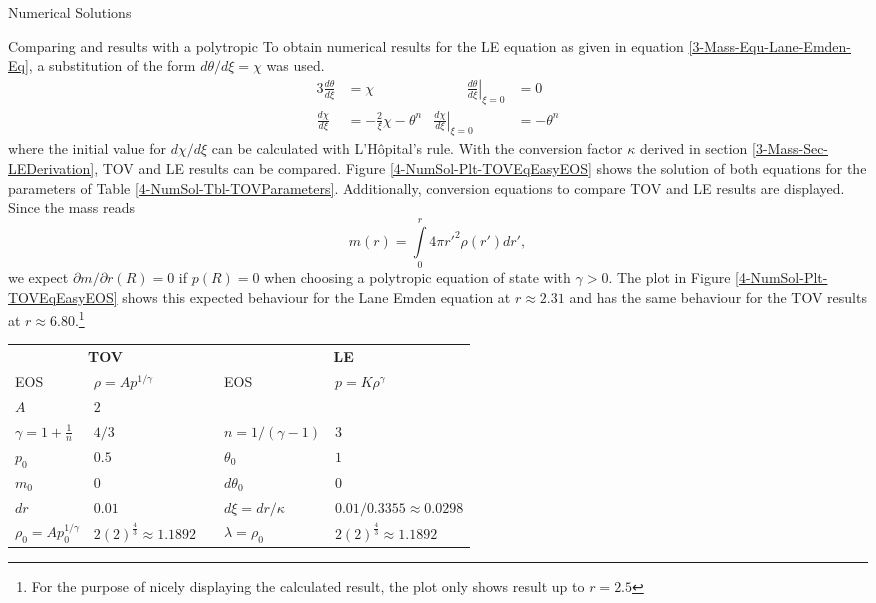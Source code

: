 \begin{section}{Numerical Solutions}
\begin{subsection}{Comparing  and  results with a polytropic }
To obtain numerical results for the \ac{LE} equation as given in equation \eqref{3-Mass-Equ-Lane-Emden-Eq}, a substitution of the form $d\theta/d\xi=\chi$ was used.
\begin{alignat}{3}
	\frac{d\theta}{d\xi} &= \chi &\hspace{1cm} \left.\frac{d\theta}{d\xi}\right|_{\xi=0} &= 0\\
	\frac{d\chi}{d\xi} &= -\frac{2}{\xi}\chi-\theta^n & \left.\frac{d\chi}{d\xi}\right|_{\xi=0} &= -\theta^n
	\label{4-NumSol-Equ-LE-Substitution}
\end{alignat}
where the initial value for $d\chi/d\xi$ can be calculated with L'Hôpital's rule. 
With the conversion factor $\kappa$ derived in section \ref{3-Mass-Sec-LEDerivation}, \ac{TOV} and \ac{LE} results can be compared. 
Figure \ref{4-NumSol-Plt-TOVEqEasyEOS} shows the solution of both equations for the parameters of Table \ref{4-NumSol-Tbl-TOVParameters}.
Additionally, conversion equations to compare \ac{TOV} and \ac{LE} results are displayed.\\
Since the mass reads
\begin{equation}
	m(r) = \int\limits_0^r 4\pi r'^2\rho(r')dr',
\end{equation}
we expect $\partial m/\partial r(R)=0$ if $p(R)=0$ when choosing a polytropic equation of state with $\gamma>0$. 
The plot in Figure \ref{4-NumSol-Plt-TOVEqEasyEOS} shows this expected behaviour for the Lane Emden equation at $r\approx2.31$ and has the same behaviour for the \ac{TOV} results at $r\approx6.80$.\footnote{For the purpose of nicely displaying the calculated result, the plot only shows result up to $r=2.5$}
\begin{table}[H]
	{\renewcommand{\arraystretch}{1.2}
	\centering
	\begin{tabular}{@{}llcll@{}}
		\toprule
		\multicolumn{2}{c}{\textbf{TOV}} & \phantom{abc} &\multicolumn{2}{c}{\textbf{LE}}\\
		\cmidrule{1-2} \cmidrule{4-5}
		EOS & $\rho=Ap^{1/\gamma}$ && EOS & $p=K\rho^{\gamma}$\\
		$A$ & $2$ & & \\
		$\gamma=1+\frac{1}{n}$ & $4/3$ && $n=1/(\gamma-1)$ & $3$\\
		$p_0$ & $0.5$ && $\theta_0$ & $1$\\
		$m_0$ & $0$ && $d\theta_0$ & $0$\\
		$dr$ & $0.01$ && $d\xi=dr/\kappa$ & $0.01/0.3355\approx0.0298$\\
		\cmidrule{1-2} \cmidrule{4-5}
		$\rho_0=Ap_0^{1/\gamma}$ & $2(2)^{\frac{4}{3}}\approx1.1892$ && $\lambda=\rho_0$ & $2(2)^{\frac{4}{3}}\approx1.1892$\\

\end{tabular}}
\end{table}
\end{subsection}
\end{section}
